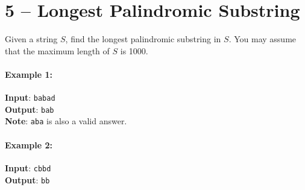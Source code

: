 \section{5 -- Longest Palindromic Substring}
Given a string $S$, find the longest palindromic substring in $S$. You may assume that the maximum length of $S$ is 1000.

\paragraph{Example 1:}

\begin{flushleft}
	\textbf{Input}: \texttt{babad}
	\\
\textbf{Output}: \texttt{bab}
\\
\textbf{Note}: \texttt{aba} is also a valid answer.
\end{flushleft}

\paragraph{Example 2:}

\begin{flushleft}
	\textbf{Input}: \texttt{cbbd}
	\\
\textbf{Output}: \texttt{bb}
\end{flushleft}


